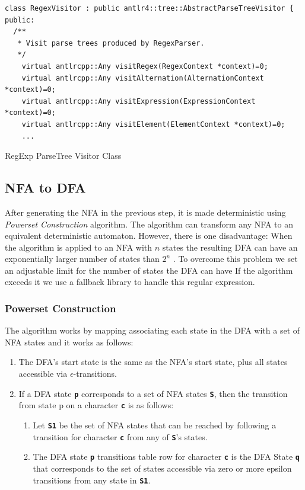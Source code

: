 \begin{listing}[htpb]
\begin{verbatim}
class RegexVisitor : public antlr4::tree::AbstractParseTreeVisitor {
public:
  /**
   * Visit parse trees produced by RegexParser.
   */
    virtual antlrcpp::Any visitRegex(RegexContext *context)=0;
    virtual antlrcpp::Any visitAlternation(AlternationContext *context)=0;
    virtual antlrcpp::Any visitExpression(ExpressionContext *context)=0;
    virtual antlrcpp::Any visitElement(ElementContext *context)=0;
    ...
\end{verbatim}
\caption[RegExp ParseTree Visitor Class]{RegExp ParseTree Visitor Class}\label{lst:fasvisitor}
\end{listing}


\subsection{NFA to DFA}\label{subsection:nfdtodfa}
After generating the NFA in the previous step, it is made deterministic using \textit{Powerset Construction} algorithm. The algorithm can transform any NFA to an equivalent deterministic automaton. However, there is one disadvantage: When the algorithm is applied to an NFA with $n$ states the resulting DFA can have an exponentially larger number of states than $2^n$ \cite{dfasize}. To overcome this problem we set an adjustable limit for the number of states the DFA can have If the algorithm exceeds it we use a fallback library to handle this regular expression.

\subsubsection{Powerset Construction}
The algorithm works by mapping associating each state in the DFA with a set of NFA states and it works as follows:
\begin{enumerate}
    \item The DFA's start state is the same as the NFA's start state, plus all states accessible via $\epsilon$-transitions.
    \item If a DFA state \texttt{\textbf{p}} corresponds to a set of NFA states \texttt{\textbf{S}}, then the transition from state p on a character \texttt{\textbf{c}} is as follows:
    \begin{enumerate}
        \item Let \texttt{\textbf{S1}} be the set of NFA states that can be reached by following a transition for character \texttt{\textbf{c}} from any of \texttt{\textbf{S}}'s states.
        \item The DFA state \texttt{\textbf{p}} transitions table row for character \texttt{\textbf{c}} is the DFA State \texttt{\textbf{q}} that corresponds to the set of states accessible via zero or more epsilon transitions from any state in \texttt{\textbf{S1}}.
    \end{enumerate}
\end{enumerate}
 


